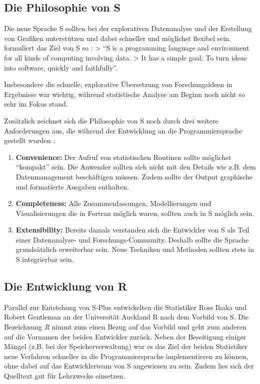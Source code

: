 \documentclass[
]{book}
\begin{document}
\hypertarget{die-philosophie-von-s}{%
\subsection{Die Philosophie von S}\label{die-philosophie-von-s}}

Die neue Sprache S sollten bei der explorativen Datenanalyse und der Erstellung von Grafiken unterstützen
und dabei schneller und möglichst flexibel sein.
\citet{Chambers_2000} formuliert das Ziel von S so :
\textgreater{} ``S is a programming language and environment for all kinds of computing involving data.
\textgreater{} It has a simple goal: To turn ideas into software, quickly and faithfully''.

Insbesondere die schnelle, explorative Übersetzung von Forschungsideen in Ergebnisse war wichtig, während statistische Analyse am Beginn noch nicht so sehr im Fokus stand.

Zusätzlich zeichnet sich die Philosophie von S noch durch drei weitere Anforderungen aus, die
während der Entwicklung an die Programmiersprache gestellt wurden \citep[S. 84:5]{Chambers_2020}:

\begin{enumerate}
\def\labelenumi{\arabic{enumi}.}
\item
  \textbf{Convenience:} Der Aufruf von statistischen Routinen sollte möglichst ``kompakt'' sein. Die Anwender sollten sich nicht mit den Details wie z.B. dem Datenmanagement beschäftigen müssen. Zudem sollte der Output graphische und formatierte Ausgaben enthalten.
\item
  \textbf{Completeness:} Alle Zusammenfassungen, Modellierungen und Visualisierungen die in Fortran möglich
  waren, sollten auch in S möglich sein.
\item
  \textbf{Extensibility:} Bereits damals verstanden sich die Entwickler von S als Teil einer Datenanalyse- und
  Forschungs-Community.
  Deshalb sollte die Sprache grundsätzlich erweiterbar sein. Neue Techniken und Methoden sollten stets in S integrierbar sein.
\end{enumerate}

\hypertarget{die-entwicklung-von-r}{%
\subsection{Die Entwicklung von R}\label{die-entwicklung-von-r}}

Parallel zur Entstehung von S-Plus entwickelten die Statistiker Ross Ihaka und Robert Gentleman
an der Universität Auckland R nach dem Vorbild von S. Die Bezeichnung \emph{R} nimmt zum einen Bezug auf das Vorbild und geht zum anderen auf die Vornamen der beiden Entwickler zurück.
Neben der Beseitigung einiger Mängel (z.B. bei der Speicherverwaltung) war es das Ziel der beiden Statistiker neue Verfahren schneller in die Programmiersprache implementieren zu können, ohne dabei auf das Entwicklerteam von S angewiesen zu sein.
Zudem lies sich der Quelltext gut für Lehrzwecke einsetzen.
\end{document}

